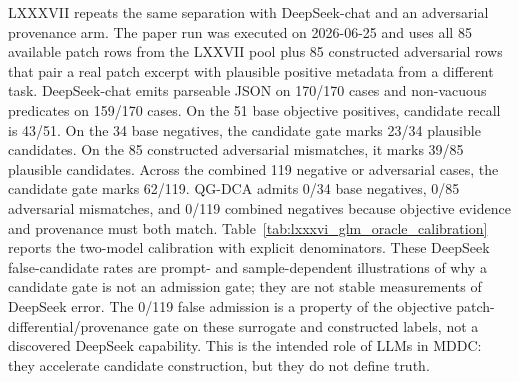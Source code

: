 ﻿\documentclass[lettersize,journal]{IEEEtran}
\begin{document}
LXXXVII repeats the same separation with DeepSeek-chat and an adversarial provenance arm. The paper run was executed on 2026-06-25 and uses all 85 available patch rows from the LXXVII pool plus 85 constructed adversarial rows that pair a real patch excerpt with plausible positive metadata from a different task. DeepSeek-chat emits parseable JSON on 170/170 cases and non-vacuous predicates on 159/170 cases. On the 51 base objective positives, candidate recall is 43/51. On the 34 base negatives, the candidate gate marks 23/34 plausible candidates. On the 85 constructed adversarial mismatches, it marks 39/85 plausible candidates. Across the combined 119 negative or adversarial cases, the candidate gate marks 62/119. QG-DCA admits 0/34 base negatives, 0/85 adversarial mismatches, and 0/119 combined negatives because objective evidence and provenance must both match. Table~\ref{tab:lxxxvi_glm_oracle_calibration} reports the two-model calibration with explicit denominators. These DeepSeek false-candidate rates are prompt- and sample-dependent illustrations of why a candidate gate is not an admission gate; they are not stable measurements of DeepSeek error. The 0/119 false admission is a property of the objective patch-differential/provenance gate on these surrogate and constructed labels, not a discovered DeepSeek capability. This is the intended role of LLMs in MDDC: they accelerate candidate construction, but they do not define truth.

\begin{table}[!t]
\caption{LXXXVI/LXXXVII candidate-oracle calibration. DeepSeek negative denominators separate 34 base negatives, 85 constructed adversarial metadata/patch mismatches, and their 119-case union. False-admission zeros are properties of the objective patch-differential/provenance gate on these surrogate labels, not model truth.}
\label{tab:lxxxvi_glm_oracle_calibration}
\centering
\scriptsize
\renewcommand{\arraystretch}{1.05}
\end{table}
\end{document}
